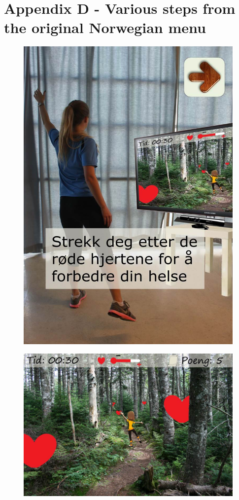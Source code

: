 \newpage
\section*{Appendix D - Various steps from the original Norwegian menu}
\label{app:menu}

\begin{figure} [H]
\centering
\includegraphics[scale=0.7]{KineIntro.jpg}
\label{fig:kineintroNorsk}
\end{figure}

\begin{figure} [H]
\centering
\includegraphics[scale=0.5]{hjerter.jpg}
\label{fig:heartsNorsk}
\end{figure}

